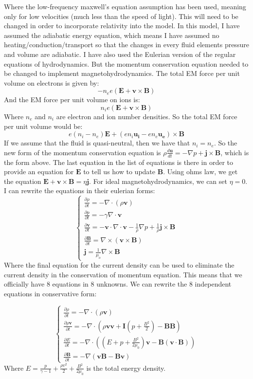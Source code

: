 \documentclass[a4paper]{article}
\begin{document}
Where the low-frequency maxwell's equation assumption has been used, meaning only for low velocities (much less than the speed of light). This will need to be changed in order to incorporate relativity into the model. In this model, I have assumed the adiabatic energy equation, which means I have assumed no heating/conduction/transport so that the changes in every fluid elements pressure and volume are adiabatic. I have also used the Eulerian version of the regular equations of hydrodynamics. But the momentum conservation equation needed to be changed to implement magnetohydrodynamics. The total EM force per unit volume on electrons is given by:
$$-n_ee(\bm{E}+\bm{v}\times \bm{B})$$
And the EM force per unit volume on ions is:
$$n_i e(\bm{E}+\bm{v}\times \bm{B})$$
Where $n_e$ and $n_i$ are electron and ion number densities. So the total EM force per unit volume would be:
$$e(n_i-n_e)\bm{E}+(en_i\bm{u_i}-en_e\bm{u_e})\times \bm{B}$$
If we assume that the fluid is quasi-neutral, then we have that $n_i=n_e$. So the new form of the momentum conservation equation is $\rho \frac{d\bm{u}}{dt}=-\nabla p+\bm{j}\times \bm{B}$, which is the form above. The last equation in the list of equations is there in order to provide an equation for $\bm{E}$ to tell us how to update $\bm{B}$. Using ohms law, we get the equation $\bm{E}+\bm{v}\times \bm{B}=\eta \bm{j}$. For ideal magnetohydrodynamics, we can set $\eta=0$. I can rewrite the equations in their eulerian forms:
\[
        \begin{cases}
                \frac{\partial \rho}{\partial t}=-\nabla \cdot (\rho \bm{v})\\
                \frac{\partial p}{\partial t}=-\gamma \nabla \cdot \bm{v}\\
                \frac{\partial \bm{v}}{\partial t}=-\bm{v}\cdot \nabla \cdot \bm{v}-\frac{1}{\rho}\nabla p + \frac{1}{\rho}\bm{j}\times \bm{B} \\
                \frac{\partial \bm{B}}{\partial t}=\nabla \times (\bm{v}\times \bm{B})\\
                \bm{j}=\frac{1}{\mu_o}\nabla \times \bm{B}
        \end{cases}
\]
Where the final equation for the current density can be used to eliminate the current density in the conservation of momentum equation. This means that we officially have 8 equations in 8 unknowns. We can rewrite the 8 independent equations in conservative form:

\[
        \begin{cases}
                \frac{\partial \rho}{\partial t}=-\nabla \cdot (\rho \bm{v})\\
                \frac{\partial \rho \bm{v}}{\partial t}=-\nabla \cdot \left( \rho \bm{v}\bm{v}+\bm{I}\left( p+\frac{B^2}{2} \right)-\bm{B}\bm{B} \right)\\
                \frac{\partial E}{\partial t}=-\nabla \cdot \left( \left( E + p +\frac{B^2}{2\mu_0} \right)\bm{v}-\bm{B}(\bm{v}\cdot \bm{B}) \right)\\
                \frac{\partial \bm{B}}{\partial t}=-\nabla (\bm{v}\bm{B}-\bm{B}\bm{v})
        \end{cases}
\]
Where $E=\frac{p}{\gamma -1 }+\frac{\rho v^2}{2}+\frac{B^2}{2\mu_0}$ is the total energy density.
\end{document}
